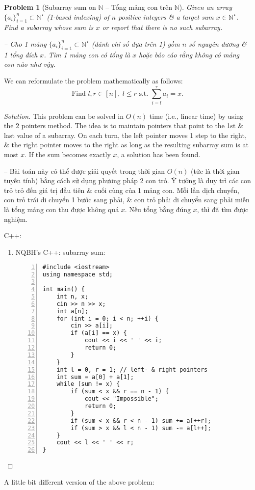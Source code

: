 \documentclass{article}
\newtheorem{problem}{Problem}
\begin{document}
\begin{problem}[Subarray sum on $\mathbb{N}$ -- Tổng mảng con trên $\mathbb{N}$]
    Given an array $\{a_i\}_{i=1}^n\subset\mathbb{N}^\star$ (1-based indexing) of $n$ positive integers \& a target sum $x\in\mathbb{N}^\star$. Find a subarray whose sum is $x$ or report that there is no such subarray.

    -- Cho 1 mảng $\{a_i\}_{i=1}^n\subset\mathbb{N}^\star$ (đánh chỉ số dựa trên 1) gồm $n$ số nguyên dương \& 1 tổng đích $x$. Tìm 1 mảng con có tổng là $x$ hoặc báo cáo rằng không có mảng con nào như vậy.
\end{problem}
We can reformulate the problem mathematically as follows:
\begin{equation*}
    \mbox{Find } l,r\in[n],\ l\le r\mbox{ s.t. }\sum_{i=l}^r a_i = x.
\end{equation*}

\begin{proof}[Solution]
    This problem can be solved in $O(n)$ time (i.e., linear time) by using the 2 pointers method. The idea is to maintain pointers that point to the 1st \& last value of a subarray. On each turn, the left pointer moves 1 step to the right, \& the right pointer moves to the right as long as the resulting subarray sum is at most $x$. If the sum becomes exactly $x$, a solution has been found.

    -- Bài toán này có thể được giải quyết trong thời gian $O(n)$ (tức là thời gian tuyến tính) bằng cách sử dụng phương pháp 2 con trỏ. Ý tưởng là duy trì các con trỏ trỏ đến giá trị đầu tiên \& cuối cùng của 1 mảng con. Mỗi lần dịch chuyển, con trỏ trái di chuyển 1 bước sang phải, \& con trỏ phải di chuyển sang phải miễn là tổng mảng con thu được không quá $x$. Nếu tổng bằng đúng $x$, thì đã tìm được nghiệm.

    C++:
    \begin{enumerate}
        \item NQBH's C++: subarray sum:
        \begin{Verbatim}[numbers=left,xleftmargin=0mm]
#include <iostream>
using namespace std;

int main() {
    int n, x;
    cin >> n >> x;
    int a[n];
    for (int i = 0; i < n; ++i) {
        cin >> a[i];
        if (a[i] == x) {
            cout << i << ' ' << i;
            return 0;
        }
    }
    int l = 0, r = 1; // left- & right pointers
    int sum = a[0] + a[1];
    while (sum != x) {
        if (sum < x && r == n - 1) {
            cout << "Impossible";
            return 0;
        }
        if (sum < x && r < n - 1) sum += a[++r];
        if (sum > x && l < n - 1) sum -= a[l++];
    }
    cout << l << ' ' << r;
}
        \end{Verbatim}
    \end{enumerate}
\end{proof}
A little bit different version of the above problem:
\end{document}
